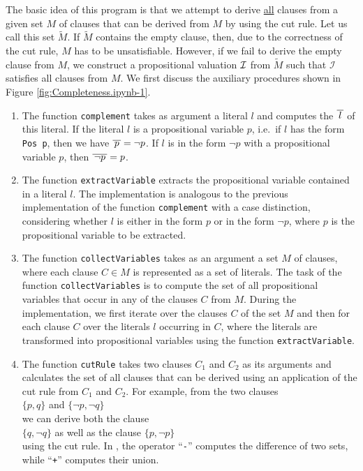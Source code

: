 The basic idea
of this program is that we attempt to derive \underline{all} clauses from a given set $M$ of clauses
that can be derived from $M$ by using the cut rule.  Let us call this set $\widetilde{M}$.  If $\widetilde{M}$ contains the empty clause,
then, due to the correctness of the cut rule, $M$ has to be unsatisfiable. However, if we fail to derive the empty clause from $M$,
we construct a propositional valuation
$\mathcal{I}$ from $\widetilde{M}$ such that $\mathcal{I}$ satisfies all clauses from $M$.
We first discuss the auxiliary procedures shown in Figure \ref{fig:Completeness.ipynb-1}.
\begin{enumerate}
\item The function \texttt{complement} takes as argument a literal $l$ and computes the
       $\overline{\,l\,}$ of this literal.
      If the literal $l$ is a propositional variable $p$, i.e.~if $l$ has the form \texttt{Pos p},
      then we have $\overline{\,p\,} = \neg p$.
      If $l$ is in the form $\neg p$ with a propositional variable $p$, then $\overline{\,\neg p\,} =
      p$.
\item The function \texttt{extractVariable} extracts the propositional variable contained in a literal $l$.
      The implementation is analogous to the previous implementation of the function 
      \texttt{complement} with a case distinction, considering whether $l$ is either in the form
      $p$ or in the form $\neg p$, where $p$ is the propositional variable to be extracted.
\item The function \texttt{collectVariables} takes as an argument a set $M$ of clauses, where each
      clause \mbox{$C \!\in\! M$} is represented as a set of literals. The task of the
      function \texttt{collectVariables} is to compute the set of all propositional variables
      that occur in any of the clauses $C$ from $M$. During the implementation, we first iterate
      over the clauses $C$ of the set $M$ and then for each clause $C$ over the literals $l$ occurring in $C$,
      where the literals are transformed into propositional variables using the function \texttt{extractVariable}.
\item The function \texttt{cutRule} takes two clauses $C_1$ and $C_2$ as its arguments and calculates
      the set of all clauses that can be derived using an application of the cut rule from $C_1$ and $C_2$.
      For example, from the two clauses
      \\[0.2cm]
      \hspace*{1.3cm}
      $\{ p, q \}$ \quad and \quad $\{ \neg p, \neg q \}$ 
      \\[0.2cm]
      we can derive both the clause
      \\[0.2cm]
      \hspace*{1.3cm}
      $\{q, \neg q\}$ \quad as well as the clause \quad $\{p, \neg p \}$
      \\[0.2cm]
      using the cut rule.  In \Fsharp, the operator ``\texttt{-}'' computes the difference of two sets,
      while ``\texttt{+}'' computes their union.
\end{enumerate}

